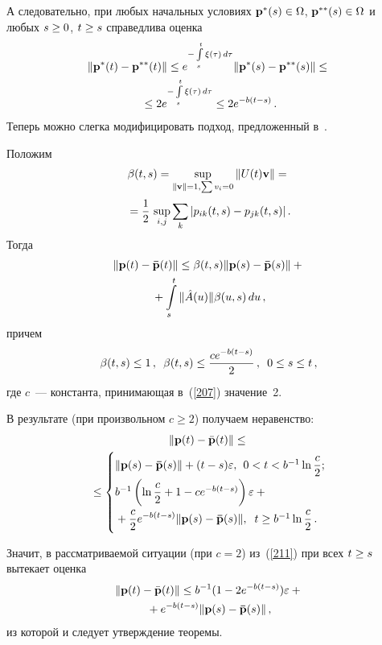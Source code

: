 \begin{multicols}{2}
А следовательно, при любых начальных условиях 
${\bf p^{*}}(s) \hm\in \Omega$,  ${\bf p^{**}}(s) \hm\in \Omega$ и 
любых $s \hm\ge 0$, $t \hm\ge s$ справедлива оценка
\begin{multline}
\|{\bf p^{*}}(t) - {\bf p^{**}}(t)\| \le  
e^{-\int\limits_s^t \xi(\tau)\, d\tau}\|{\bf p^{*}}(s) - {\bf p^{**}}(s)\| \le{}\\
{}\le 2e^{-\int\limits_s^t \xi(\tau)\, d\tau} \le 2 e^{-b(t-s)}\,.
\label{207}
\end{multline}
Теперь можно слегка модифицировать подход, предложенный в~\cite{mit03}.

Положим
\begin{multline*} 
\beta (t, s)=\sup\limits_{ \| {\bf v} \| =1, \sum v_i=0} {\|U(t){\bf v}\|} ={} \\
{}= \displaystyle\frac{\displaystyle 1\mathstrut}{\displaystyle 2\mathstrut} \,\sup\limits_{i,j} \sum\limits_k {|p_{ik}(t, s)-p_{jk}(t, s)|}\,.
\end{multline*}
Тогда
\begin{multline*}
\|{\bf p}(t)-{\bf \bar{p}}(t)\| \le \beta(t,s)\|{\bf p}(s)-{\bf \bar{p}}(s)\| +{}\\
{}+ \int\limits_s^t \|\hat{A}(u)\| \beta(u, s)\, du\,,
\end{multline*}
причем
\begin{equation*}
\beta (t,s) \le 1\,, \enskip \beta (t,s) \le \displaystyle\frac{\displaystyle ce^{-b(t-s)}\mathstrut}{\displaystyle 2\mathstrut}\,, \enskip 0 \le s \le t\,,
\end{equation*}
где $c$~--- константа, принимающая в~(\ref{207}) значение~2.

В результате (при произвольном $c\ge 2$) получаем неравенство:
\begin{multline} 
\|{\bf p}(t)-\bar{\bf p}(t)\| \le{} \\
\!\!\!{}\le
\begin{cases}
\|{\bf p}(s)-{\bf \bar{p}}(s)\|+ (t-s)\varepsilon , &\!\!\!\!\!\!\!\!\!\!\!\!\!\!\!\!\!\!\! 0<t< b^{-1} \ln {\fr{c}{2}}; \\
b^{-1}\left(\ln {\fr{c}{2}} +1-ce^{-b(t-s)}\right)\varepsilon +{}&\\
{}+ \fr{c}{2}e^{-b(t-s)} \|{\bf p}(s)-{\bf \bar{p}}(s)\|, &\!\!\!\!\!\!\!\!\!\!\!\!\! 
t\ge b^{-1}\ln {\fr{c}{2}}\,.
\end{cases}\!\!
\label{211}
\end{multline}

Значит, в рассматриваемой ситуации (при $c=2$) из~(\ref{211}) при всех $t \hm\ge s$ 
вытекает оценка
\begin{multline*}
\|{\bf p}(t)-\bar{\bf p}(t)\| \le
b^{-1}(1-2e^{-b(t-s)})\varepsilon +{}\\
{}+ e^{-b(t-s)} \|{\bf p}(s)-{\bf \bar{p}}(s)\|\,,
\end{multline*}
из которой и следует утверждение теоремы.


\end{multicols}
